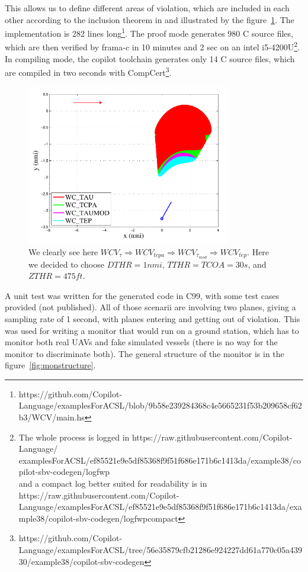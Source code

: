 \documentclass[a4paper,11pt,final]{article}
\begin{document}
	This allows us to define different areas of violation, which are included in each other according to the inclusion theorem in \cite{WCV1} and illustrated by the figure~\ref{fig:graph}. The implementation is 282 lines long\footnote{https://github.com/Copilot-Language/examplesForACSL/blob/9b58e239284368c4e5665231f53b209658cf62b3/WCV/main.hs}. The proof mode generates 980 C source files, which are then verified by frama-c in 10 minutes and 2 sec on an intel i5-4200U\footnote{The whole process is logged in  https://raw.githubusercontent.com/Copilot-Language/\\examplesForACSL/ef85521e9e5df85368f9f51f686e171b6c1413da/example38/copilot-sbv-codegen/logfwp \\ and a compact log better suited for readability is in  https://raw.githubusercontent.com/Copilot-Language/examplesForACSL/ef85521e9e5df85368f9f51f686e171b6c1413da/example38/copilot-sbv-codegen/logfwpcompact}. In compiling mode, the copilot toolchain generates only 14 C source files, which are compiled in two seconds with CompCert\footnote{https://github.com/Copilot-Language/examplesForACSL/tree/56e35879cfb21286e924227dd61a770c05a43930/example38/copilot-sbv-codegen}.
	
	\begin{figure}[!ht]
		\centering
		\includegraphics[height=70mm]{images/WCV/graph.pdf}
		\caption{We clearly see here $WCV_{\tau} \Rightarrow WCV_{tcpa} \Rightarrow WCV_{\tau_{mod}} \Rightarrow WCV_{tep}$. Here we decided to choose $DTHR = 1 nmi$, $TTHR = TCOA = 30 s$, and $ZTHR = 475 ft$. }
		\label{fig:graph}
	\end{figure} 
	
	A unit test was written for the generated code in C99, with some test cases provided (not published). All of those scenarii are involving two planes, giving a sampling rate of 1 second, with planes entering and getting out of violation. This was used for writing a monitor that would run on a ground station, which has to monitor both real UAVs and fake simulated vessels (there is no way for the monitor to discriminate both). The general structure of the monitor is in the figure~\ref{fig:monstructure}. 
	
\end{document}
